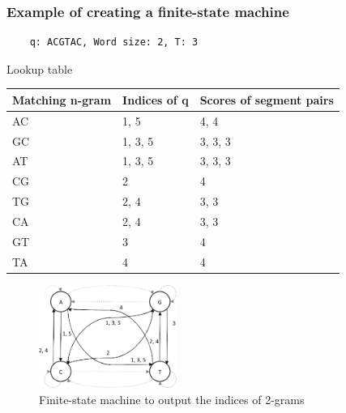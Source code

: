 %
%
\subsubsection*{Example of creating a finite-state machine} 

\begin{verbatim}
    q: ACGTAC, Word size: 2, T: 3
\end{verbatim} 

Lookup table
\begin{table}[H]
\small
\begin{tabular}{|l|l|l|}
\hline
\textbf{Matching n-gram} & \textbf{Indices of q} & \textbf{Scores of segment pairs} \\ \hline
AC                       & 1, 5                  & 4, 4                             \\ \hline
GC                       & 1, 3, 5               & 3, 3, 3                          \\ \hline
AT                       & 1, 3, 5               & 3, 3, 3                          \\ \hline
CG                       & 2                     & 4                                \\ \hline
TG                       & 2, 4                  & 3, 3                             \\ \hline
CA                       & 2, 4                  & 3, 3                             \\ \hline
GT                       & 3                     & 4                                \\ \hline
TA                       & 4                     & 4                                \\ \hline
\end{tabular}
\end{table}


\begin{figure}[H]
  \centering
      \includegraphics[width=0.4\textwidth]{fig05/fsm_example.png}
  \caption{Finite-state machine to output the indices of 2-grams}
\end{figure}

